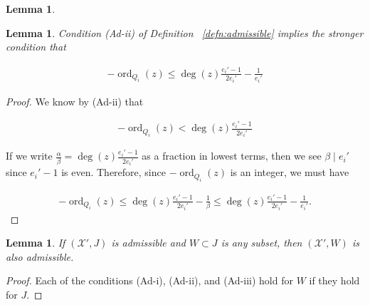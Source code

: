 \documentclass{amsart}
\theoremstyle{plain}
\newtheorem{lem}[thm]{Lemma}
\theoremstyle{definition}
\theoremstyle{remark}
\numberwithin{equation}{section}
\newcommand \sx{\mathscr X}
\DeclareMathOperator{\ord}{ord}
\newcommand \subhalf[1]{\frac{{#1} - 1}{2{#1}}}
\begin{document}
\begin{lem}\label{lem:n-3s-admissible}
\end{lem}


\begin{lem}
\label{lem:admissible_inequality}
Condition (Ad-ii) of Definition ~\ref{defn:admissible} implies the
stronger condition that

\begin{align*}
	-\ord_{Q_i}(z) \leq \deg(z) \subhalf{e_i'}-\frac{1}{e_i'}
\end{align*}
\end{lem}

\begin{proof}
We know by (Ad-ii) that

\begin{align*}
	-\ord_{Q_i}(z) < \deg(z) \subhalf{e_i'}
\end{align*}

\noindent
If we write $\frac{\alpha}{\beta} = \deg(z) \frac{e_i'-1}{2e_i'}$ 
as a fraction in lowest terms, then we see $\beta \mid e_i'$ since $
e_i'-1$ is even. Therefore, since $-\ord_{Q_i}(z)$ is an integer, 
we must have

\begin{align*}
	-\ord_{Q_i}(z) \leq \deg(z) \subhalf{e_i'}- \frac{1}{\beta} \leq 
	\deg(z) \subhalf{e_i'}- \frac{1}{e_i'}.
\end{align*}
\end{proof}

\begin{lem}
\label{lem:admissible_subset}
If $(\sx', J)$ is admissible and $W \subset J$ is any subset,
then $(\sx', W)$ is also admissible.
\end{lem}

\begin{proof}
Each of the conditions (Ad-i), (Ad-ii), and (Ad-iii) hold for $W$
if they hold for $J$.
\end{proof}
\end{document}
